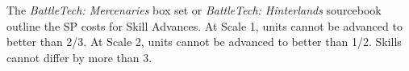 The \emph{BattleTech: Mercenaries} box set or \emph{BattleTech: Hinterlands} sourcebook outline the SP costs for Skill Advances.
At Scale 1, units cannot be advanced to better than 2/3.
At Scale 2, units cannot be advanced to better than 1/2.
Skills cannot differ by more than 3.
